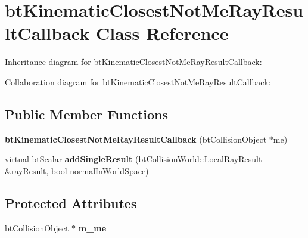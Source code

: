 \hypertarget{classbt_kinematic_closest_not_me_ray_result_callback}{\section{bt\+Kinematic\+Closest\+Not\+Me\+Ray\+Result\+Callback Class Reference}
\label{classbt_kinematic_closest_not_me_ray_result_callback}
}


Inheritance diagram for bt\+Kinematic\+Closest\+Not\+Me\+Ray\+Result\+Callback\+:


Collaboration diagram for bt\+Kinematic\+Closest\+Not\+Me\+Ray\+Result\+Callback\+:
\subsection*{Public Member Functions}
\begin{DoxyCompactItemize}
\item 
\hypertarget{classbt_kinematic_closest_not_me_ray_result_callback_aa539e37d46a890bc029b6ce7e7e00498}{{\bfseries bt\+Kinematic\+Closest\+Not\+Me\+Ray\+Result\+Callback} (bt\+Collision\+Object $\ast$me)}\label{classbt_kinematic_closest_not_me_ray_result_callback_aa539e37d46a890bc029b6ce7e7e00498}

\item 
\hypertarget{classbt_kinematic_closest_not_me_ray_result_callback_a8cf27c3c05134a19031519f908d4b73c}{virtual bt\+Scalar {\bfseries add\+Single\+Result} (\hyperlink{structbt_collision_world_1_1_local_ray_result}{bt\+Collision\+World\+::\+Local\+Ray\+Result} \&ray\+Result, bool normal\+In\+World\+Space)}\label{classbt_kinematic_closest_not_me_ray_result_callback_a8cf27c3c05134a19031519f908d4b73c}

\end{DoxyCompactItemize}
\subsection*{Protected Attributes}
\begin{DoxyCompactItemize}
\item 
\hypertarget{classbt_kinematic_closest_not_me_ray_result_callback_a22df57a16186c13bcccd9ff7050cbeb8}{bt\+Collision\+Object $\ast$ {\bfseries m\+\_\+me}}\label{classbt_kinematic_closest_not_me_ray_result_callback_a22df57a16186c13bcccd9ff7050cbeb8}

\end{DoxyCompactItemize}
